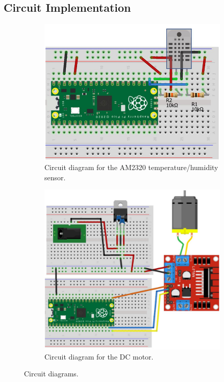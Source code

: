 \documentclass[11pt]{article}
\begin{document}
\subsection{Circuit Implementation}
\begin{figure}
    \centering
      \begin{subfigure}{0.45\textwidth}
        \includegraphics[width=\linewidth]{circuitDiagramSensor}
        \caption{Circuit diagram for the AM2320 temperature/humidity sensor.}
        \label{circuitDiagramSensor}
      \end{subfigure}
      \begin{subfigure}{0.40\textwidth}
        \includegraphics[width=\linewidth]{circuitDiagramMotor}
        \caption{Circuit diagram for the DC motor.}
        \label{circuitDiagramMotor}
      \end{subfigure}
    \caption{Circuit diagrams.}
    \label{circuitImplementation}
\end{figure}
\end{document}
